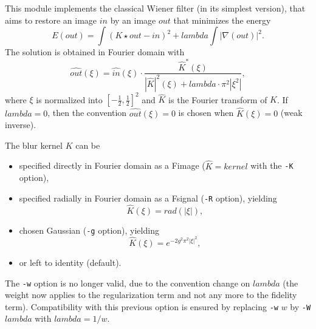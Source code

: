This module implements the classical Wiener filter 
(in its simplest version),
that aims to restore an image $in$ by an image $out$ that minimizes the energy
$$E(out) = \int (K \star out -in)^2 + lambda \int |\nabla(out)|^2.$$
The solution is obtained in Fourier domain with
$$\widehat{out}(\xi) = \widehat{in}(\xi) \cdot
\frac{\hat K^*(\xi)}{|\hat K|^2(\xi) + lambda\cdot \pi^2|\xi^2|},$$
where $\xi$ is normalized into $[-\frac 12,\frac 12]^2$ and
$\hat K$ is the Fourier transform of $K$.
If $lambda=0$, then the convention $\widehat{out}(\xi)=0$ is chosen
when $\hat K(\xi)=0$ (weak inverse).

\medskip

The blur kernel $K$ can be 
\begin{itemize}
\item specified directly in Fourier domain as a Fimage
($\hat K = kernel$ with the \verb+-K+ option), 
\item specified radially in Fourier domain as a Fsignal (\verb+-R+ option), yielding
$$\hat K(\xi) = rad(|\xi|),$$
\item chosen Gaussian (\verb+-g+ option), yielding
$$\hat K(\xi) = e^{-2g^2\pi^2|\xi|^2},$$ 
\item or left to identity (default).
\end{itemize}

\medskip

The \verb+-w+ option is no longer valid, due to the convention change on
$lambda$ (the weight now applies to the regularization term and not any more
to the fidelity term). Compatibility with this previous option is ensured
by replacing \verb+-w+ $w$ by \verb+-W+ $lambda$ with $lambda=1/w$.
